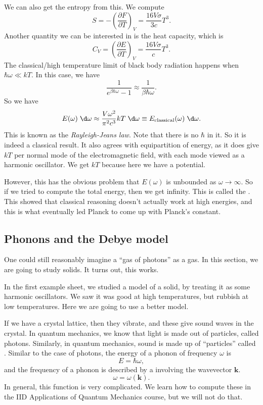 \documentclass[a4paper]{article}
\begin{document}
We can also get the entropy from this. We compute
\[
  S = -\left(\frac{\partial F}{\partial T}\right)_V = \frac{16 V \sigma}{3c}T^3.
\]
Another quantity we can be interested in is the heat capacity, which is
\[
  C_V = \left(\frac{\partial E}{\partial T}\right)_V = \frac{16 V \sigma}{c} T^3.
\]
The classical/high temperature limit of black body radiation happens when $\hbar \omega \ll kT$. In this case, we have
\[
  \frac{1}{e^{\beta \hbar \omega} - 1} \approx \frac{1}{\beta \hbar \omega}.
\]
So we have
\[
  E(\omega) \;\d \omega \approx \frac{V \omega^2}{\pi^2 c^3}kT \;\d \omega \equiv E_{\mathrm{classical}} (\omega) \;\d \omega.
\]
This is known as the \emph{Rayleigh-Jeans law}. Note that there is no $\hbar$ in it. So it is indeed a classical result. It also agrees with equipartition of energy, as it does give $kT$ per normal mode of the electromagnetic field, with each mode viewed as a harmonic oscillator. We get $kT$ because here we have a potential. %

However, this has the obvious problem that $E(\omega)$ is unbounded as $\omega \to \infty$. So if we tried to compute the total energy, then we get infinity. This is called the . This showed that classical reasoning doesn't actually work at high energies, and this is what eventually led Planck to come up with Planck's constant.

\subsection{Phonons and the Debye model}
One could still reasonably imagine a ``gas of photons'' as a gas. In this section, we are going to study solids. It turns out, this works.

In the first example sheet, we studied a model of a solid, by treating it as some harmonic oscillators. We saw it was good at high temperatures, but rubbish at low temperatures. Here we are going to use a better model.

If we have a crystal lattice, then they vibrate, and these give sound waves in the crystal. In quantum mechanics, we know that light is made out of particles, called photons. Similarly, in quantum mechanics, sound is made up of ``particles'' called . Similar to the case of photons, the energy of a phonon of frequency $\omega$ is
\[
  E = \hbar \omega,
\]
and the frequency of a phonon is described by a  involving the wavevector $\mathbf{k}$.
\[
  \omega = \omega(\mathbf{k}).
\]
In general, this function is very complicated. We learn how to compute these in the IID Applications of Quantum Mechanics course, but we will not do that.
\end{document}
